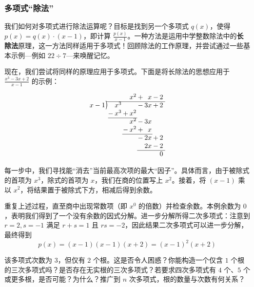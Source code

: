 \subsubsection*{多项式``除法''}

我们如何对多项式进行除法运算呢？目标是找到另一个多项式 $q(x)$，使得 $p(x) = q(x) \cdot (x - 1)$，即计算 $\frac{p(x)}{x-1}$。一种方法是运用中学整数除法中的\textbf{长除法}原理，这一方法同样适用于多项式！回顾除法的工作原理，并尝试通过一些基本示例---例如 $22 \div 7$---来唤醒记忆。

现在，我们尝试将同样的原理应用于多项式。下面是将长除法的思想应用于 $\frac{x^3-3x+2}{x-1}$ 的示例：

\[
\arraycolsep=1pt
\begin{array}{*1r @{\hskip\arraycolsep}c@{\hskip\arraycolsep} *{9}r}
        &          &   &      &   & x^2 & + &  x & - & 2 &  \\
\cline{2-11}
x-1     & \longdiv &   & x^3  &   &  & -    & 3x & + & 2 &  \\
        &          & - & x^3  & + & x^2 &   &    &   &   &  \\
\cline{3-6}
        &          &   &      &   & x^2 & - & 3x &   &   &  \\
        &          &   &      & - & x^2 & + &  x &   &   &  \\
\cline{5-8}
        &          &   &      &   &     & - & 2x & + & 2 &  \\
        &          &   &      &   &     &   & 2x & - & 2 &  \\
\cline{7-11}
        &          &   &      &   &     &   &    &   & 0 &  \\
\end{array}
\]

每一步中，我们寻找能``消去''当前最高次项的最大``因子''。具体而言，由于被除式的首项为 $x^3$，除式的首项为 $x$，我们在商的位置写上 $x^2$。接着，将 $(x-1)$ 乘以 $x^2$，将结果置于被除式下方，相减后得到余数。

重复上述过程，直至商中出现常数项（即 $x^0$ 的倍数）并检查余数。本例余数为 $0$，表明我们得到了一个没有余数的因式分解。进一步分解所得二次多项式：注意到 $r=2, s=-1$ 满足 $r+s=1$ 且 $rs=-2$，因此结果二次多项式可以进一步分解，最终得到
\[p(x) = (x - 1)(x - 1)(x + 2) = (x - 1)^2(x + 2)\]

该多项式次数为 $3$，但仅有 $2$ 个根。这是否令人困惑？你能构造一个仅含 $1$ 个根的三次多项式吗？是否存在无实根的三次多项式？若要求四次多项式有 $4$ 个、$5$ 个或更多根，是否可能？为什么？推广到 $n$ 次多项式，根的数量与次数有何关系？

